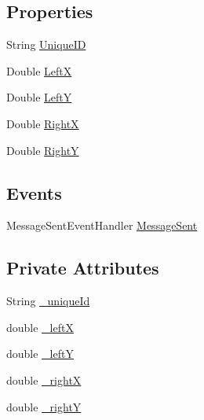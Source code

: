 \subsection*{Properties}
\begin{DoxyCompactItemize}
\item 
String \hyperlink{class_web_analyzer_1_1_models_1_1_message_model_1_1_data_message_af8ea083fd4035d8c786f5da12bc01917}{Unique\+I\+D}
\item 
Double \hyperlink{class_web_analyzer_1_1_models_1_1_message_model_1_1_data_message_adadb413f3e7d845538561b2a65596722}{Left\+X}
\item 
Double \hyperlink{class_web_analyzer_1_1_models_1_1_message_model_1_1_data_message_a409dc72ec09e601fbbd9dc4db680932c}{Left\+Y}
\item 
Double \hyperlink{class_web_analyzer_1_1_models_1_1_message_model_1_1_data_message_ab650b2ca778810b8a6fbd0d7530318a9}{Right\+X}
\item 
Double \hyperlink{class_web_analyzer_1_1_models_1_1_message_model_1_1_data_message_a3b554f231e24414cfa625552ff2635df}{Right\+Y}
\end{DoxyCompactItemize}
\subsection*{Events}
\begin{DoxyCompactItemize}
\item 
Message\+Sent\+Event\+Handler \hyperlink{class_web_analyzer_1_1_models_1_1_message_model_1_1_data_message_a09dc25c903bc851fddabb0d075cca5f6}{Message\+Sent}
\end{DoxyCompactItemize}
\subsection*{Private Attributes}
\begin{DoxyCompactItemize}
\item 
String \hyperlink{class_web_analyzer_1_1_models_1_1_message_model_1_1_data_message_a4c8a2ce0d65c6caae14863897eeb602d}{\+\_\+unique\+Id}
\item 
double \hyperlink{class_web_analyzer_1_1_models_1_1_message_model_1_1_data_message_ac9721293fa81833e18b244b11c6eed11}{\+\_\+left\+X}
\item 
double \hyperlink{class_web_analyzer_1_1_models_1_1_message_model_1_1_data_message_a093686b36f2a672787a3d2a7b03709c8}{\+\_\+left\+Y}
\item 
double \hyperlink{class_web_analyzer_1_1_models_1_1_message_model_1_1_data_message_a2fea12857a3954edd96d248fa4dbb673}{\+\_\+right\+X}
\item 
double \hyperlink{class_web_analyzer_1_1_models_1_1_message_model_1_1_data_message_a898ed683213c5e3ad74d42b9ecd4e590}{\+\_\+right\+Y}
\end{DoxyCompactItemize}
